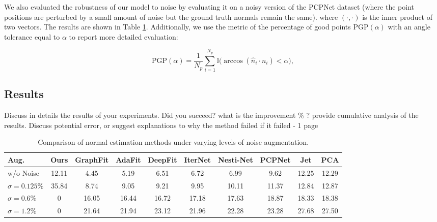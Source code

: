 \documentclass{acmart}
\begin{document}
We also evaluated the robustness of our model to noise by evaluating it on a noisy version of the PCPNet dataset (where the point positions are perturbed by a small amount of noise but the ground truth normals remain the same). where $(\cdot, \cdot)$ is the inner product of two vectors. The results are shown in Table \ref{tab:noise_comparison}. Additionally, we use the metric
of the percentage of good points $\text{PGP}(\alpha)$ with an angle tolerance equal to $\alpha$ to
report more detailed evaluation:

\begin{equation}
\text{PGP}(\alpha) = \frac{1}{N_p} \sum_{i=1}^{N_p} \mathbb{I} \big( \arccos(\hat{n}_i \cdot n_i) < \alpha \big),
\end{equation}
 \subsection{Results}
 Discuss in details the results of your experiments. Did you succeed? what is the improvement \% ? provide cumulative analysis of the results. Discuss potential error, or suggest explanations to why the method failed if it failed - 
 1 page

 \begin{table}[ht]
  \centering
  \caption{Comparison of normal estimation methods under varying levels of noise augmentation.}
  \label{tab:noise_comparison}
  \begin{tabular}{lccccccccc}
  \hline
  \textbf{Aug.} & \textbf{Ours} & \textbf{GraphFit} & \textbf{AdaFit} & \textbf{DeepFit} & \textbf{IterNet} & \textbf{Nesti-Net} & \textbf{PCPNet} & \textbf{Jet} & \textbf{PCA} \\ \hline
  w/o Noise & 12.11 & 4.45  & 5.19  & 6.51  & 6.72  & 6.99  & 9.62  & 12.25 & 12.29 \\
  $\sigma = 0.125\%$ & 35.84 & 8.74  & 9.05  & 9.21  & 9.95  & 10.11 & 11.37 & 12.84 & 12.87 \\
  $\sigma = 0.6\%$  & 0 & 16.05 & 16.44 & 16.72 & 17.18 & 17.63 & 18.87 & 18.33 & 18.38 \\
  $\sigma = 1.2\%$  & 0 & 21.64 & 21.94 & 23.12 & 21.96 & 22.28 & 23.28 & 27.68 & 27.50 \\ \hline
  \end{tabular}
  \end{table}
\end{document}
